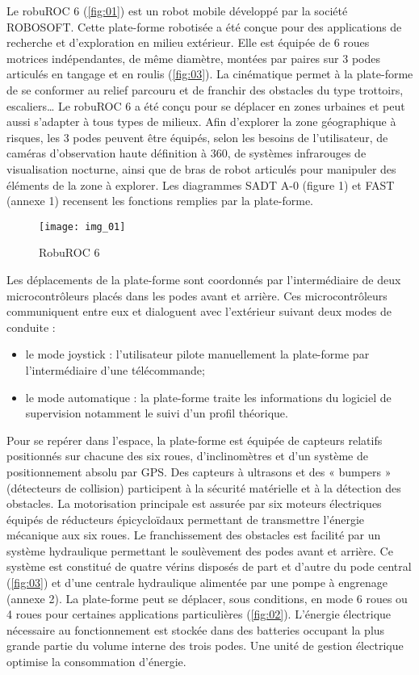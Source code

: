 Le robuROC 6 (\autoref{fig:01}) est un robot mobile développé par la société ROBOSOFT. Cette plate-forme robotisée a été conçue pour des applications de recherche et d’exploration en milieu extérieur. Elle est équipée de 6 roues motrices indépendantes, de même diamètre, montées par paires sur 3 podes articulés en tangage et en roulis (\autoref{fig:03}). La cinématique permet à la plate-forme de se conformer au relief parcouru et de franchir des obstacles du type trottoirs, escaliers… Le robuROC 6 a été conçu pour se déplacer en zones urbaines et peut aussi s’adapter à tous types de milieux.  Afin d’explorer la zone géographique à risques, les 3 podes peuvent être équipés, selon les besoins de l’utilisateur, de caméras d’observation haute définition à 360\degres, de systèmes infrarouges de visualisation nocturne, ainsi que de bras de robot articulés pour manipuler des éléments de la zone à explorer. Les diagrammes SADT A-0 (figure 1) et FAST (annexe 1) recensent les fonctions remplies par la plate-forme.

\begin{figure}
\centering
\texttt{[image: img\_01]}
\caption{RobuROC 6 \label{fig:01}}
\end{figure}

Les déplacements de la plate-forme sont coordonnés par l’intermédiaire de deux microcontrôleurs placés dans les podes avant et arrière. Ces microcontrôleurs communiquent entre eux et dialoguent avec l’extérieur suivant deux modes de conduite : 
\begin{itemize}
\item le mode joystick : l’utilisateur pilote manuellement la plate-forme par l’intermédiaire d’une télécommande;
\item le mode automatique : la plate-forme traite les informations du logiciel de supervision notamment le suivi d’un profil théorique.
\end{itemize}

Pour se repérer dans l’espace, la plate-forme est équipée de capteurs relatifs positionnés sur chacune des six roues, d’inclinomètres et d’un système de positionnement absolu par GPS. Des capteurs à ultrasons et des « bumpers » (détecteurs de collision) participent à la sécurité matérielle et à la détection des obstacles.
La motorisation principale est assurée par six moteurs électriques équipés de réducteurs épicycloïdaux permettant de transmettre l’énergie mécanique aux six roues. Le franchissement des obstacles est facilité par un système hydraulique permettant le soulèvement des podes avant et arrière. Ce système est constitué de quatre vérins disposés de part et d’autre du pode central (\autoref{fig:03}) et d’une centrale hydraulique alimentée par une pompe à engrenage (annexe 2). La plate-forme peut se déplacer, sous conditions, en mode 6 roues ou 4 roues pour certaines applications particulières (\autoref{fig:02}). L’énergie électrique nécessaire au fonctionnement est stockée dans des batteries occupant la plus grande partie du volume interne des trois podes. Une unité de gestion électrique optimise la consommation d’énergie. 

